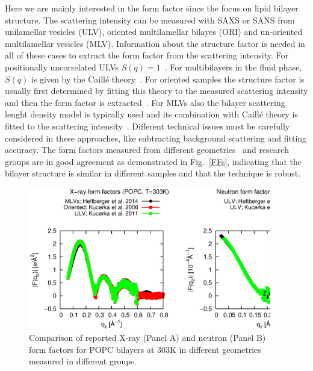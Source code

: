 \documentclass[aps,prl,superscriptaddress,twocolumn]{revtex4}
\begin{document}
Here we are mainly interested in the form factor since the focus on lipid bilayer structure.
The scattering intensity can be measured with SAXS or SANS from unilamellar vesicles (ULV), 
oriented multilamellar bilayes (ORI) and un-oriented multilamellar vesicles (MLV).
Information about the structure factor is needed in all of these cases to extract the 
form factor from the scattering intensity. For positionally uncorrelated ULVs $S(q)=1$~\cite{Marquardt2015}. 
For multibilayers in the fluid phase, $S(q)$ is given by the Caill\'{e} theory~\cite{Zhang.1994,Lyatskaya.2001}.
For oriented samples the structure factor is usually first determined by fitting this theory to the 
measured scattering intensity and then the form factor is extracted~\cite{kucerka05}.
For MLVs also the bilayer scattering lenght density model is typically used and its combination with 
Caill\'{e} theory is fitted to the scattering intensity~\cite{Heftberger.2014}. 
Different technical issues must be carefully considered in these approaches, like 
subtracting background scattering and fitting accuracy. The form factors measured 
from different geometries~\cite{kucerka05,kucerka07} and research groups are in good agreement
as demonstrated in Fig.~\ref{FFs}, indicating that the bilayer structure is similar in different samples
and that the technique is robust.
\begin{figure}[]
	\includegraphics[width=10.6cm]{../Fig/FFs.eps}
	\caption{\label{FormF_comp}
		Comparison of reported X-ray (Panel A) and neutron (Panel B) form factors for POPC bilayers at 303K in different geometries
                measured in different groups.
	} 
\end{figure}
\end{document}
